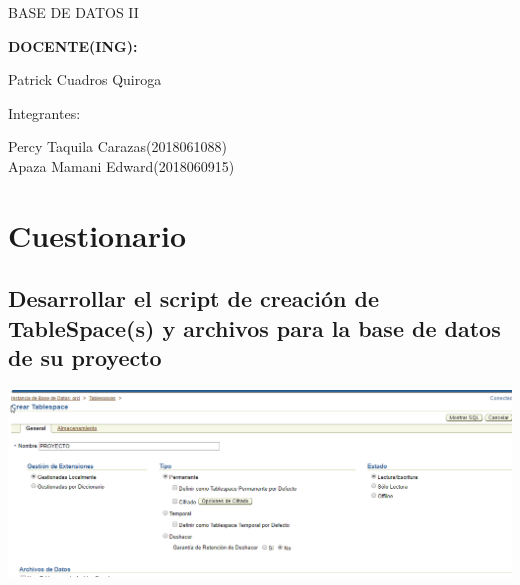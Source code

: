 \documentclass[12pt,letterpaper]{article}
\begin{document}
\begin{titlepage}
\begin{center}
\vspace*{0.1in}
\begin{large}
BASE DE DATOS II\\
\end{large}

\vspace*{0.3in}
\begin{Large}
\textbf{DOCENTE(ING):} \\
\end{Large}

\vspace*{0.1in}
\begin{large}
 Patrick Cuadros Quiroga\\
\end{large}

\vspace*{0.2in}
\vspace*{0.1in}
\begin{large}
Integrantes: \\
\begin{flushleft}
Percy Taquila Carazas\hfill	(2018061088) \\
Apaza Mamani Edward\hfill	(2018060915) \\
\end{flushleft}
\end{large}
\end{center}

\end{titlepage}

\tableofcontents %
\thispagestyle{empty} %
\newpage
\setcounter{page}{1} %




\section{Cuestionario}
\subsection{Desarrollar el script de creación de TableSpace(s) y archivos para la base de datos de
su proyecto}

\begin{center}
	\includegraphics[width=15cm]{./Imagenes/1} 
\end{center}
\end{document}
